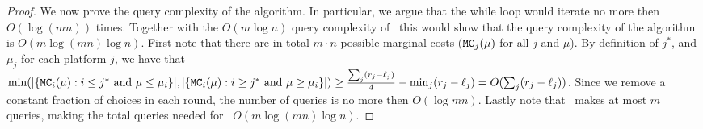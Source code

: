 \begin{proof}
We now prove the query complexity of the algorithm. In particular, we argue that the while loop would iterate no more then $O(\log (mn))$ times. Together with the $O(m \log n)$ query complexity of \matchingmc\ this would show that the query complexity of the algorithm is $O(m \log (mn) \log n)$. First note that there are in total $m\cdot n$ possible marginal costs ($\texttt{MC}_j(\mu)$ for all $j$ and $\mu$). By definition of $j^*$, and $\mu_j$ for each platform $j$, we have that  
$\min(|\{\texttt{MC}_i(\mu): i \leq j^* \text{ and } \mu \leq \mu_i\}|, |\{\texttt{MC}_i(\mu): i \geq j^* \text{ and } \mu \geq \mu_i\}|) \geq \frac{\sum_{j}(r_j - \ell_j)}{4} - \min_j(r_j - \ell_j) = O(\sum_{j}(r_j - \ell_j))$. Since we remove a constant fraction of choices in each round, the number of queries is no more then $O(\log mn)$. Lastly note that \roundup\  makes at most $m$ queries, making the total queries needed for \mom\ $O(m \log (mn) \log n)$.
\end{proof}